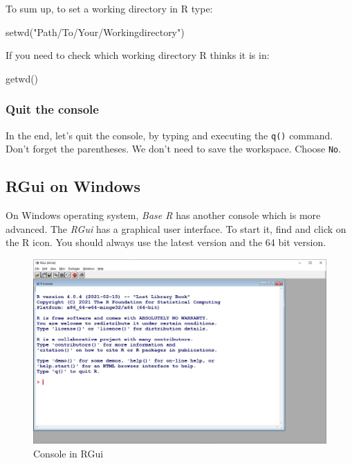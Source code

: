 \documentclass[
]{book}
\newenvironment{Shaded}{\begin{snugshade}}{\end{snugshade}}
\newcommand{\FunctionTok}[1]{\textcolor[rgb]{0.00,0.00,0.00}{#1}}
\newcommand{\NormalTok}[1]{#1}
\newcommand{\StringTok}[1]{\textcolor[rgb]{0.31,0.60,0.02}{#1}}
\begin{document}
To sum up, to set a working directory in R type:

\begin{Shaded}
\begin{Highlighting}[]
\FunctionTok{setwd}\NormalTok{(}\StringTok{"Path/To/Your/Workingdirectory"}\NormalTok{)}
\end{Highlighting}
\end{Shaded}

If you need to check which working directory R thinks it is in:

\begin{Shaded}
\begin{Highlighting}[]
\FunctionTok{getwd}\NormalTok{()}
\end{Highlighting}
\end{Shaded}

\hypertarget{quit-the-console}{%
\subsubsection{Quit the console}\label{quit-the-console}}

In the end, let's quit the console, by typing and executing the \texttt{q()}
command. Don't forget the parentheses. We don't need to save the
workspace. Choose \texttt{No}.

\hypertarget{rgui-on-windows}{%
\subsection{RGui on Windows}\label{rgui-on-windows}}

On Windows operating system, \emph{Base R} has another console which is more
advanced. The \emph{RGui} has a graphical user interface. To start it, find
and click on the R icon. You should always use the latest version and
the 64 bit version.

\begin{figure}

{\centering \includegraphics[width=0.7\linewidth]{img/rgui} 

}

\caption{Console in RGui}\label{fig:unnamed-chunk-12}
\end{figure}
\end{document}
